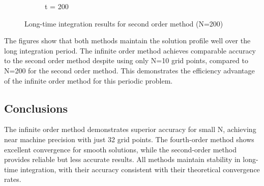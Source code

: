 \documentclass{article}
\begin{document}
\begin{figure}[htbp]
\begin{subfigure}[b]{0.32\textwidth}
        \caption{t = 200}
    \end{subfigure}
    \caption{Long-time integration results for second order method (N=200)}
    \label{fig:long_time_second}
\end{figure}

The figures show that both methods maintain the solution profile well over the long integration period. The infinite order method achieves comparable accuracy to the second order method despite using only N=10 grid points, compared to N=200 for the second order method. This demonstrates the efficiency advantage of the infinite order method for this periodic problem.

\subsection{Conclusions}
The infinite order method demonstrates superior accuracy for small N, achieving near machine precision with just 32 grid points. The fourth-order method shows excellent convergence for smooth solutions, while the second-order method provides reliable but less accurate results. All methods maintain stability in long-time integration, with their accuracy consistent with their theoretical convergence rates.
\end{document}
